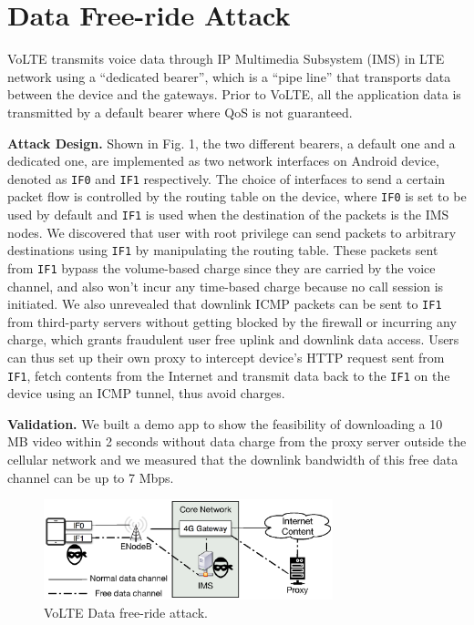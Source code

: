 \section{Data Free-ride Attack}
\label{sec:intro}
VoLTE transmits voice data through IP Multimedia Subsystem (IMS) in LTE network using a ``dedicated bearer'', which is a ``pipe line'' that transports data between the device and the gateways. Prior to VoLTE, all the application data is transmitted by a default bearer where QoS is not guaranteed.

\textbf{Attack Design. }Shown in Fig. 1, the two different bearers, a default one and a dedicated one, are implemented as two network interfaces on Android device, denoted as \texttt{IF0} and \texttt{IF1} respectively. The choice of interfaces to send a certain packet flow is controlled by the routing table on the device, where \texttt{IF0} is set to be used by default and \texttt{IF1} is used when the destination of the packets is the IMS nodes. We discovered that user with root privilege can send packets to arbitrary destinations using \texttt{IF1} by manipulating the routing table. These packets sent from \texttt{IF1} bypass the volume-based charge since they are carried by the voice channel, and also won't incur any time-based charge because no call session is initiated. We also unrevealed that downlink ICMP packets can be sent to \texttt{IF1} from third-party servers without getting blocked by the firewall or incurring any charge, which grants fraudulent user free uplink and downlink data access. Users can thus set up their own proxy to intercept device's HTTP request sent from \texttt{IF1}, fetch contents from the Internet and transmit data back to the \texttt{IF1} on the device using an ICMP tunnel, thus avoid charges.

\textbf{Validation.} We built a demo app to show the feasibility of downloading a 10 MB video within 2 seconds without data charge from the proxy server outside the cellular network and we measured that the downlink bandwidth of this free data channel can be up to 7 Mbps.

\begin{figure}[!t]
\hspace{-0.2in}
\centering
\includegraphics[width=3.3in]{figs/poster.eps}
\caption{VoLTE Data free-ride attack.}
\vspace{-0.1in}
\label{fig:attack}
\end{figure}

